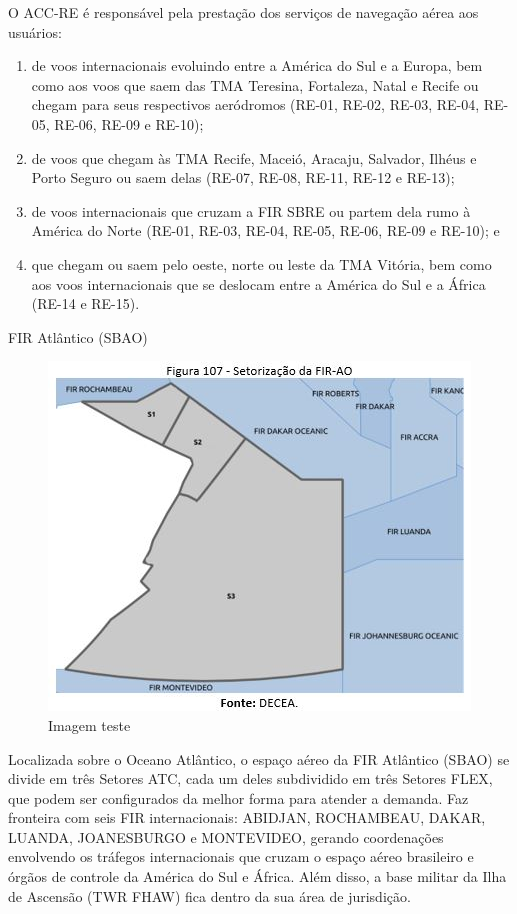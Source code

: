 \documentclass[
]{book}
\begin{document}
O ACC-RE é responsável pela prestação dos serviços de navegação aérea aos usuários:

\begin{enumerate}
\def\labelenumi{\alph{enumi})}
\item
  de voos internacionais evoluindo entre a América do Sul e a Europa, bem como aos voos que saem das TMA Teresina, Fortaleza, Natal e Recife ou chegam para seus respectivos aeródromos (RE-01, RE-02, RE-03, RE-04, RE-05, RE-06, RE-09 e RE-10);
\item
  de voos que chegam às TMA Recife, Maceió, Aracaju, Salvador, Ilhéus e Porto Seguro ou saem delas (RE-07, RE-08, RE-11, RE-12 e RE-13);
\item
  de voos internacionais que cruzam a FIR SBRE ou partem dela rumo à América do Norte (RE-01, RE-03, RE-04, RE-05, RE-06, RE-09 e RE-10); e
\item
  que chegam ou saem pelo oeste, norte ou leste da TMA Vitória, bem como aos voos internacionais que se deslocam entre a América do Sul e a África (RE-14 e RE-15).
\end{enumerate}

FIR Atlântico (SBAO)

\begin{figure}
\centering
\includegraphics{imagens/fig99.jpg}
\caption{Imagem teste}
\end{figure}

Localizada sobre o Oceano Atlântico, o espaço aéreo da FIR Atlântico (SBAO) se divide em três Setores ATC, cada um deles subdividido em três Setores FLEX, que podem ser configurados da melhor forma para atender a demanda. Faz fronteira com seis FIR internacionais: ABIDJAN, ROCHAMBEAU, DAKAR, LUANDA, JOANESBURGO e MONTEVIDEO, gerando coordenações envolvendo os tráfegos internacionais que cruzam o espaço aéreo brasileiro e órgãos de controle da América do Sul e África. Além disso, a base militar da Ilha de Ascensão (TWR FHAW) fica dentro da sua área de jurisdição.
\end{document}
